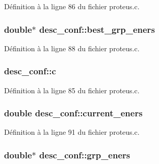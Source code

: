 Définition à la ligne 86 du fichier proteus.\+c.

\hypertarget{structdesc__conf_ab33e8b3852770c2a02ec4c0f4aed7175}{
\subsubsection[{best\+\_\+grp\+\_\+eners}]{\setlength{\rightskip}{0pt plus 5cm}double$\ast$ desc\+\_\+conf\+::best\+\_\+grp\+\_\+eners}}\label{structdesc__conf_ab33e8b3852770c2a02ec4c0f4aed7175}


Définition à la ligne 88 du fichier proteus.\+c.

\hypertarget{structdesc__conf_a3c0b7a75dae18ea3fda2eb4c20f99c97}{
\subsubsection[{c}]{ desc\+\_\+conf\+::c}}\label{structdesc__conf_a3c0b7a75dae18ea3fda2eb4c20f99c97}


Définition à la ligne 85 du fichier proteus.\+c.

\hypertarget{structdesc__conf_a3f02f26d6d7a76e22a958984d37d259d}{
\subsubsection[{current\+\_\+eners}]{\setlength{\rightskip}{0pt plus 5cm}double desc\+\_\+conf\+::current\+\_\+eners}}\label{structdesc__conf_a3f02f26d6d7a76e22a958984d37d259d}


Définition à la ligne 91 du fichier proteus.\+c.

\hypertarget{structdesc__conf_a51e46e1ff13876b1edb91e0b8de5218c}{
\subsubsection[{grp\+\_\+eners}]{\setlength{\rightskip}{0pt plus 5cm}double$\ast$ desc\+\_\+conf\+::grp\+\_\+eners}}\label{structdesc__conf_a51e46e1ff13876b1edb91e0b8de5218c}


